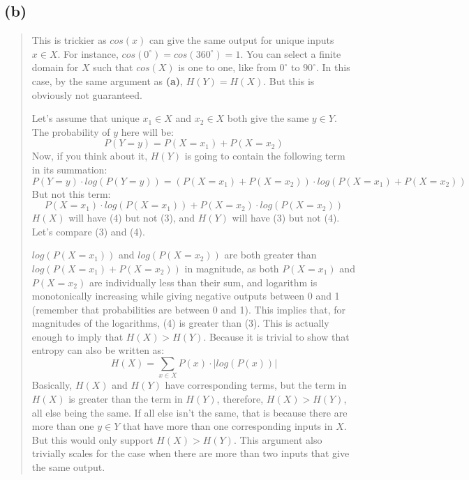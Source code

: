\documentclass{article}
\begin{document}
\subsection*{(b)}
\begin{quote}
	This is trickier as $cos(x)$ can give the same output for unique inputs $x \in X$. For instance, $cos(0^{\circ}) = cos(360^{\circ}) = 1$. You can select a finite domain for $X$ such that $cos(X)$ is one to one, like from $0^\circ$ to $90^\circ$.  In this case, by the same argument as \textbf{(a)}, $H(Y)=H(X)$. But this is obviously not guaranteed.

	Let's assume that unique $x_1 \in X$ and $x_2 \in X$ both give the same $y \in Y$. The probability of $y$ here will be:
	\begin{equation}
		P(Y=y) = P(X=x_1) + P(X=x_2)
	\end{equation}
	Now, if you think about it, $H(Y)$ is going to contain the following term in its summation:
	\begin{equation}
		P(Y=y) \cdot log(P(Y=y)) = (P(X=x_1) + P(X=x_2)) \cdot log(P(X=x_1) + P(X=x_2))
	\end{equation}
	But not this term:
	\begin{equation}
		P(X=x_1) \cdot log(P(X=x_1)) + P(X=x_2) \cdot log(P(X=x_2))
	\end{equation}
	$H(X)$ will have (4) but not (3), and $H(Y)$ will have (3) but not (4). Let's compare (3) and (4).

	$log(P(X=x_1))$ and $log(P(X=x_2))$ are both greater than $log(P(X=x_1) + P(X=x_2))$ in magnitude, as both $P(X=x_1)$ and $P(X=x_2)$ are individually less than their sum, and logarithm is monotonically increasing while giving negative outputs between 0 and 1 (remember that probabilities are between 0 and 1). This implies that, for magnitudes of the logarithms, (4) is greater than (3). This is actually enough to imply that $H(X) > H(Y)$. Because it is trivial to show that entropy can also be written as:
	\begin{equation}
		H(X) = \sum_{x \in X} P(x) \cdot |log(P(x))|
	\end{equation}
	Basically, $H(X)$ and $H(Y)$ have corresponding terms, but the term in $H(X)$ is greater than the term in $H(Y)$, therefore, $H(X) > H(Y)$, all else being the same. If all else isn't the same, that is because there are more than one $y \in Y$ that have more than one corresponding inputs in $X$. But this would only support $H(X) > H(Y)$. This argument also trivially scales for the case when there are more than two inputs that give the same output. 

\end{quote}
\end{document}
